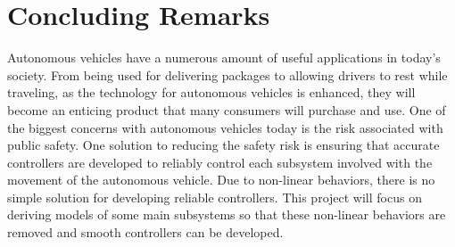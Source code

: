 \documentclass[letterpaper,12pt]{article}   %
\begin{document}

\section{Concluding Remarks}
Autonomous vehicles have a numerous amount of useful applications in today's society. From being used for delivering packages to allowing drivers to rest while traveling, as the technology for autonomous vehicles is enhanced, they will become an enticing product that many consumers will purchase and use. One of the biggest concerns with autonomous vehicles today is the risk associated with public safety. One solution to reducing the safety risk is ensuring that accurate controllers are developed to reliably control each subsystem involved with the movement of the autonomous vehicle. Due to non-linear behaviors, there is no simple solution for developing reliable controllers. This project will focus on deriving models of some main subsystems so that these non-linear behaviors are removed and smooth controllers can be developed.

\pagebreak


\end{document}

